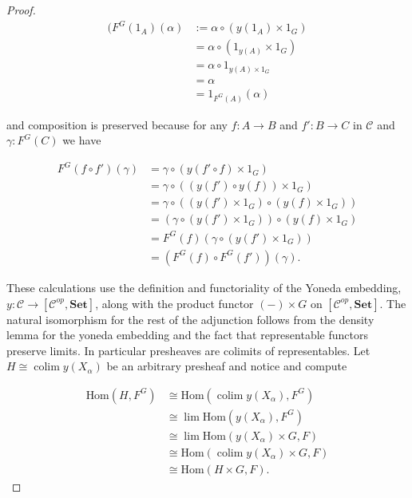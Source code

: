 \documentclass[11pt]{amsart}
\theoremstyle{plain}
\theoremstyle{definition}
\newcommand{\cC}{{\mathcal C}}
\newcommand{\Hom}{\text{Hom}}
\newcommand{\Set}{{\mathbf{Set}}}
\newcommand{\noi}{{\noindent}}
\DeclareMathOperator{\colim}{colim}
\begin{document}
\begin{proof}
    \begin{align*}
    (F^G(1_A)(\alpha) 
    &:= \alpha \circ (y(1_A) \times 1_G) \\
    &= \alpha \circ (1_{y(A)} \times 1_G) \\
    &= \alpha \circ 1_{y(A) \times 1_G} \\
    &= \alpha \\
    &= 1_{F^G(A)} (\alpha)
    \end{align*}


    \noi and composition is preserved because for any $f : A \to B$ and $f' : B \to C$ in $\cC$ and $\gamma : F^G(C)$ we have 

    \begin{align*}
    F^G(f \circ f') (\gamma)
    &= \gamma \circ (y(f' \circ f) \times 1_G) \\
    &= \gamma \circ ((y(f') \circ y(f)) \times 1_G) \\
    &= \gamma \circ \left((y(f') \times 1_G) \circ (y(f) \times 1_G)\right) \\
    &= \left(\gamma \circ (y(f') \times 1_G)\right) \circ (y(f) \times 1_G) \\
    &= F^G(f) \left(\gamma \circ (y(f') \times 1_G)\right)  \\
    &= \left(F^G(f) \circ F^G(f')\right) (\gamma) .
    \end{align*}

    \noi These calculations use the definition and functoriality of the Yoneda embedding, $y : \cC \to [\cC^{op}, \Set]$, along with the product functor $(-) \times G$ on $[\cC^{op} , \Set]$. The natural isomorphism for the rest of the adjunction follows from the density lemma for the yoneda embedding and the fact that representable functors preserve limits. In particular presheaves are colimits of representables. Let $H \cong \colim y(X_\alpha)$ be an arbitrary presheaf and notice and compute 
    
    \begin{align*}
    \Hom (H, F^G) 
    &\cong \Hom (\colim y(X_\alpha) , F^G) \\
    &\cong \lim \Hom(y(X_\alpha) , F^G) \\
    &\cong \lim \Hom(y(X_\alpha) \times G, F) \\
    &\cong \Hom(\colim y(X_\alpha) \times G , F) \\
    &\cong \Hom(H \times G, F).
    \end{align*}
    


\end{proof}
\end{document}
